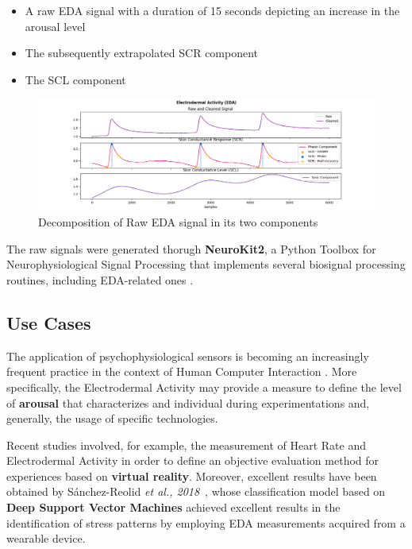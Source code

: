 \begin{itemize}
    \item A raw EDA signal with a duration of 15 seconds depicting an increase in the arousal level
    \item The subsequently extrapolated SCR component
    \item The SCL component
\end{itemize}

\begin{figure}[h]
    \centering
    \includegraphics[width=\textwidth]{./images/eda-simulation.png}
    \caption{Decomposition of Raw EDA signal in its two components}
    \label{fig:eda-example}
\end{figure}

The raw signals were generated thorugh \textbf{NeuroKit2}, a Python Toolbox for Neurophysiological Signal Processing that implements several biosignal processing routines, including EDA-related ones \cite{neurokit}.

\subsection{Use Cases}\label{subsec:eda-usecases}

The application of psychophysiological sensors is becoming an increasingly frequent practice in the context of Human Computer Interaction \cite{eda-hci}. More specifically, the Electrodermal Activity may provide a measure to define the level of \textbf{arousal} that characterizes and individual during experimentations and, generally, the usage of specific technologies.

Recent studies involved, for example, the measurement of Heart Rate and Electrodermal Activity in order to define an objective evaluation method for experiences based on \textbf{virtual reality}. Moreover, excellent results have been obtained by Sánchez-Reolid \textit{et al., 2018}~\cite{edasvm}, whose classification model based on \textbf{Deep Support Vector Machines} achieved excellent results in the identification of stress patterns by employing EDA measurements acquired from a wearable device.


